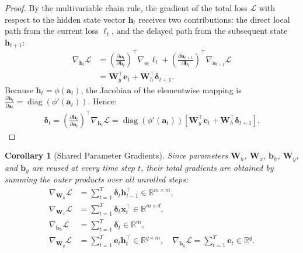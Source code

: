 \documentclass[11pt,a4paper]{article}
\theoremstyle{definition}
\theoremstyle{plain}
\newtheorem{corollary}{Corollary}[section]
\begin{document}
\begin{proof}
By the multivariable chain rule, the gradient of the total loss $\mathcal{L}$ with respect to the hidden state vector $\mathbf{h}_t$ receives two contributions: the direct local path from the current loss $\ell_t$, and the delayed path from the subsequent state $\mathbf{h}_{t+1}$:
\begin{align}
    \nabla_{\mathbf{h}_t} \mathcal{L} &= \left( \frac{\partial \mathbf{o}_t}{\partial \mathbf{h}_t} \right)^\top \nabla_{\mathbf{o}_t} \ell_t + \left( \frac{\partial \mathbf{a}_{t+1}}{\partial \mathbf{h}_t} \right)^\top \nabla_{\mathbf{a}_{t+1}} \mathcal{L} \\
    &= \mathbf{W}_y^\top \mathbf{e}_t + \mathbf{W}_h^\top \boldsymbol{\delta}_{t+1}.
\end{align}
Because $\mathbf{h}_t = \phi(\mathbf{a}_t)$, the Jacobian of the elementwise mapping is $\frac{\partial \mathbf{h}_t}{\partial \mathbf{a}_t} = \operatorname{diag}(\phi'(\mathbf{a}_t))$. Hence:
\begin{align}
    \boldsymbol{\delta}_t = \left( \frac{\partial \mathbf{h}_t}{\partial \mathbf{a}_t} \right)^\top \nabla_{\mathbf{h}_t} \mathcal{L} = \operatorname{diag}\left(\phi'(\mathbf{a}_t)\right) \left[ \mathbf{W}_y^\top \mathbf{e}_t + \mathbf{W}_h^\top \boldsymbol{\delta}_{t+1} \right].
\end{align}
\end{proof}

\begin{corollary}[Shared Parameter Gradients]
Since parameters $\mathbf{W}_h$, $\mathbf{W}_x$, $\mathbf{b}_h$, $\mathbf{W}_y$, and $\mathbf{b}_y$ are reused at every time step $t$, their total gradients are obtained by summing the outer products over all unrolled steps:
\begin{align}
    \nabla_{\mathbf{W}_h} \mathcal{L} &= \sum_{t=1}^T \boldsymbol{\delta}_t \mathbf{h}_{t-1}^\top \in \mathbb{R}^{m \times m}, \label{eq:grad_wh} \\
    \nabla_{\mathbf{W}_x} \mathcal{L} &= \sum_{t=1}^T \boldsymbol{\delta}_t \mathbf{x}_t^\top \in \mathbb{R}^{m \times d}, \label{eq:grad_wx} \\
    \nabla_{\mathbf{b}_h} \mathcal{L} &= \sum_{t=1}^T \boldsymbol{\delta}_t \in \mathbb{R}^m, \label{eq:grad_bh} \\
    \nabla_{\mathbf{W}_y} \mathcal{L} &= \sum_{t=1}^T \mathbf{e}_t \mathbf{h}_t^\top \in \mathbb{R}^{q \times m}, \quad \nabla_{\mathbf{b}_y} \mathcal{L} = \sum_{t=1}^T \mathbf{e}_t \in \mathbb{R}^q. \label{eq:grad_out}
\end{align}
\end{corollary}
\end{document}
